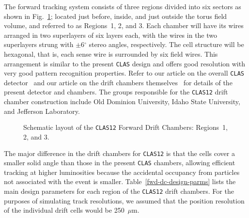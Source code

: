 The forward tracking system consists of three regions divided into six
sectors as shown in Fig.~\ref{umbrella}; located just before, inside, 
and just outside the torus field volume, and referred to as Regions~1, 2, 
and 3.  Each chamber will have its wires arranged in two superlayers of
six layers each, with the wires in the two superlayers strung with 
$\pm$6$^\circ$ stereo angles, respectively.  The cell structure will be 
hexagonal, that is, each sense wire is surrounded by six field wires.  This 
arrangement is similar to the present {\tt CLAS} design and offers good 
resolution with very good pattern recognition properties.  Refer to our 
article on the overall {\tt CLAS} detector~\cite{clasnim} and our article 
on the drift chambers themselves~\cite{dcnim} for details of the present 
detector and chambers.  The groups responsible for the {\tt CLAS12} drift
chamber construction include Old Dominion University, Idaho State
University, and Jefferson Laboratory.

\begin{figure}[htbp]
\vspace{10.6cm}
\caption{\small{Schematic layout of the {\tt CLAS12} Forward Drift Chambers: 
Regions~1, 2, and 3.}}
\label{umbrella}
\end{figure}

The major difference in the drift chambers for {\tt CLAS12} is that the 
cells cover a smaller solid angle than those in the present {\tt CLAS} 
chambers, allowing efficient tracking at higher luminosities because the 
accidental occupancy from particles not associated with the event is smaller.  
Table~\ref{fwd-dc-design-parms} lists the main design parameters for each 
region of the {\tt CLAS12} drift chambers.  For the purposes of simulating 
track resolutions, we assumed that the position resolution of the individual 
drift cells would be 250~$\mu$m.  

